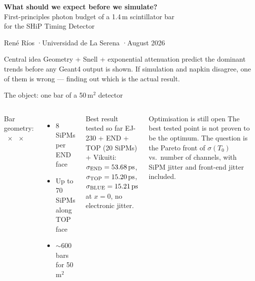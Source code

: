 \documentclass[aspectratio=169,9pt]{beamer}
\newcommand{\sigT}{\sigma(T_0)}
\newcommand{\sE}{\sigma_{\mathrm{END}}}
\newcommand{\sT}{\sigma_{\mathrm{TOP}}}
\newcommand{\sB}{\sigma_{\mathrm{BLUE}}}
\begin{document}

\begin{frame}[plain]
  \vspace{1.2cm}
  \begin{center}
    {\Large\bfseries What should we expect before we simulate?}\\[6pt]
    {\small First-principles photon budget of a 1.4\,m scintillator bar\\
    for the SHiP Timing Detector}
  \end{center}
  \vspace{0.6cm}
  \begin{center}
    René Ríos \quad·\quad Universidad de La Serena \quad·\quad August 2026
  \end{center}
  \vspace{0.4cm}
  \begin{block}{Central idea}
    {\small Geometry + Snell + exponential attenuation predict the dominant trends
    before any Geant4 output is shown.
    If simulation and napkin disagree, one of them is wrong — finding out which
    is the actual result.}
  \end{block}
\end{frame}

\begin{frame}{The object: one bar of a 50\,m$^2$ detector}
  \begin{columns}[T]
      {\small Bar geometry: \NapLmm\ $\times$ \NapWmm\ $\times$ \NapHmm}\\[4pt]
      \begin{itemize}\setlength\itemsep{3pt}
        \item[$\bullet$] 8 SiPMs per END face
        \item[$\bullet$] Up to 70 SiPMs along TOP face
        \item[$\bullet$] $\sim$600 bars for 50\,m$^2$
      \end{itemize}
      \vspace{6pt}
      \begin{block}{Best result tested so far}
        {\footnotesize EJ-230 + END + TOP (20 SiPMs) + Vikuiti:\\
        $\sE=\NapsigmaENDbestps$,\;
        $\sT=\NapsigmaTOPbestps$,\;
        $\sB=\NapsigmaBLUEbestps$\\
        at $x=0$, no electronic jitter.}
      \end{block}

      \begin{alertblock}{Optimisation is still open}
        {\footnotesize The best tested point is not proven to be the optimum.
        The question is the Pareto front of $\sigT$ vs.\ number of channels,
        with SiPM jitter and front-end jitter included.}
      \end{alertblock}
  \end{columns}
\end{frame}
\end{document}

